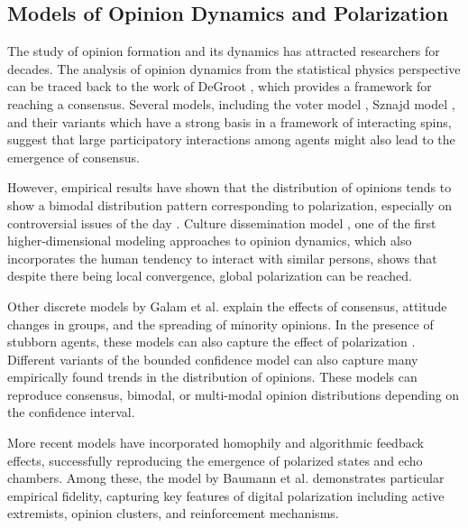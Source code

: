 \subsection{Models of Opinion Dynamics and Polarization}
The study of opinion formation and its dynamics has attracted researchers for decades. The analysis of opinion dynamics from the statistical physics perspective can be traced back to the work of DeGroot \cite{reaching-a-consensus}, which provides a framework for reaching a consensus. Several models, including the voter model \cite{the-voter-model, reality-inspired-voter-models-a-mini-review}, Sznajd model \cite{opinion-evolution-in-closed-community, sznajd-review}, and their variants which have a strong basis in a framework of interacting spins, suggest that large participatory interactions among agents might also lead to the emergence of consensus.

However, empirical results have shown that the distribution of opinions tends to show a bimodal distribution pattern corresponding to polarization, especially on controversial issues of the day \cite{biased-assimilation-and-attitude-polarization, have-americans-social-attitudes-become-more-polarized, paritisans-without-constrait-political-polarization-and-trends}. Culture dissemination model \cite{the-dissemination-of-culture}, one of the first higher-dimensional modeling approaches to opinion dynamics, which also incorporates the human tendency to interact with similar persons, shows that despite there being local convergence, global polarization can be reached. 

Other discrete models by Galam et al. \cite{galam1982sociophysics, galam1991towards, galam2002minority, galam2012sociophysics} explain the effects of consensus, attitude changes in groups, and the spreading of minority opinions. In the presence of stubborn agents, these models can also capture the effect of polarization \cite{galam2007role, galam2016stubbornness, galam2011collective}. Different variants of the bounded confidence model \cite{mixing-beliefs-among-interacting-agents, opinioin-dynamics-and-bounded-confidence} can also capture many empirically found trends in the distribution of opinions. These models can reproduce consensus, bimodal, or multi-modal opinion distributions depending on the confidence interval.

More recent models have incorporated homophily and algorithmic feedback effects, successfully reproducing the emergence of polarized states and echo chambers. Among these, the model by Baumann et al. \cite{modeling-echo-chambers-and-polarizaiton-dynamics-in-social-networks} demonstrates particular empirical fidelity, capturing key features of digital polarization including active extremists, opinion clusters, and reinforcement mechanisms.

